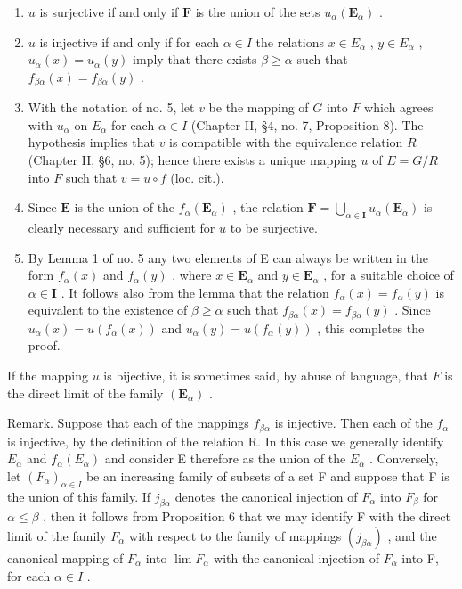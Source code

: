 \begin{enumerate}
\def\labelenumi{(\alph{enumi})}
\setcounter{enumi}{1}
\item
  \(u\) is surjective if and only if \(\mathbf{F}\) is the union of the sets \(u_{\alpha}(\mathbf{E}_{\alpha})\) .
\item
  \(u\) is injective if and only if for each \(\alpha \in I\) the relations \(x \in E_{\alpha}\) , \(y \in E_{\alpha}\) , \(u_{\alpha}(x) = u_{\alpha}(y)\) imply that there exists \(\beta \geqslant \alpha\) such that \(f_{\beta \alpha}(x) = f_{\beta \alpha}(y)\) .
\item
  With the notation of no. 5, let \(v\) be the mapping of \(G\) into \(F\) which agrees with \(u_{\alpha}\) on \(E_{\alpha}\) for each \(\alpha \in I\) (Chapter II, §4, no. 7, Proposition 8). The hypothesis implies that \(v\) is compatible with the equivalence relation \(R\) (Chapter II, §6, no. 5); hence there exists a unique mapping \(u\) of \(E = G / R\) into \(F\) such that \(v = u \circ f\) (loc. cit.).
\item
  Since \(\mathbf{E}\) is the union of the \(f_{\alpha}(\mathbf{E}_{\alpha})\) , the relation \(\mathbf{F} = \bigcup_{\alpha \in \mathbf{I}} u_{\alpha}(\mathbf{E}_{\alpha})\) is clearly necessary and sufficient for \(u\) to be surjective.
\item
  By Lemma 1 of no. 5 any two elements of E can always be written in the form \(f_{\alpha}(x)\) and \(f_{\alpha}(y)\) , where \(x \in \mathbf{E}_{\alpha}\) and \(y \in \mathbf{E}_{\alpha}\) , for a suitable choice of \(\alpha \in \mathbf{I}\) . It follows also from the lemma that the relation \(f_{\alpha}(x) = f_{\alpha}(y)\) is equivalent to the existence of \(\beta \geqslant \alpha\) such that \(f_{\beta \alpha}(x) = f_{\beta \alpha}(y)\) . Since \(u_{\alpha}(x) = u(f_{\alpha}(x))\) and \(u_{\alpha}(y) = u(f_{\alpha}(y))\) , this completes the proof.
\end{enumerate}

If the mapping \(u\) is bijective, it is sometimes said, by abuse of language, that \(F\) is the direct limit of the family \((\mathbf{E}_{\alpha})\) .

Remark. Suppose that each of the mappings \(f_{\beta \alpha}\) is injective. Then each of the \(f_{\alpha}\) is injective, by the definition of the relation R. In this case we generally identify \(E_{\alpha}\) and \(f_{\alpha}(E_{\alpha})\) and consider E therefore as the union of the \(E_{\alpha}\) . Conversely, let \((F_{\alpha})_{\alpha \in I}\) be an increasing family of subsets of a set F and suppose that F is the union of this family. If \(j_{\beta \alpha}\) denotes the canonical injection of \(F_{\alpha}\) into \(F_{\beta}\) for \(\alpha \leqslant \beta\) , then it follows from Proposition 6 that we may identify F with the direct limit of the family \(F_{\alpha}\) with respect to the family of mappings \((j_{\beta \alpha})\) , and the canonical mapping of \(F_{\alpha}\) into \(\lim F_{\alpha}\) with the canonical injection of \(F_{\alpha}\) into F, for each \(\alpha \in I\) .

